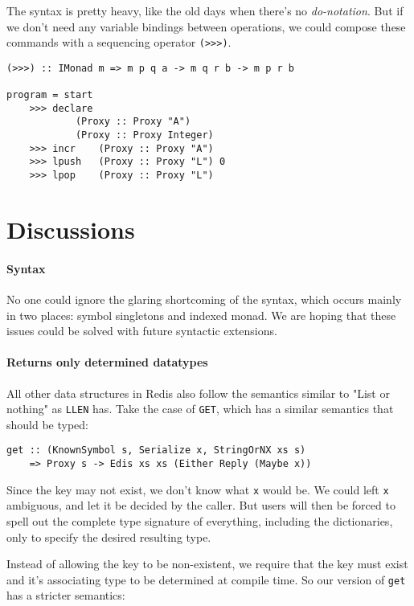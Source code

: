 \documentclass[pldi]{sigplanconf-pldi16}
\begin{document}
The syntax is pretty heavy, like the old days when there's no
 \emph{do-notation}\cite{history}. But if we don't need any variable bindings
 between operations, we could compose these commands with a sequencing operator
 \texttt{(>>>)}.

\begin{verbatim}
(>>>) :: IMonad m => m p q a -> m q r b -> m p r b

program = start
    >>> declare
            (Proxy :: Proxy "A")
            (Proxy :: Proxy Integer)
    >>> incr    (Proxy :: Proxy "A")
    >>> lpush   (Proxy :: Proxy "L") 0
    >>> lpop    (Proxy :: Proxy "L")
\end{verbatim}

\section{Discussions}
\paragraph{Syntax}
No one could ignore the glaring shortcoming of the syntax, which occurs mainly
 in two places: symbol singletons and indexed monad. We are hoping that these
 issues could be solved with future syntactic extensions.

\paragraph{Returns only determined datatypes}

All other data structures in Redis also follow the semantics similar to
 "List or nothing" as \texttt{LLEN} has. Take the case of
 \texttt{GET}, which has a similar semantics that should be typed:

\begin{verbatim}
get :: (KnownSymbol s, Serialize x, StringOrNX xs s)
    => Proxy s -> Edis xs xs (Either Reply (Maybe x))
\end{verbatim}

Since the key may not exist, we don't know what \texttt{x} would
be. We could left \texttt{x} ambiguous, and let it be decided by
 the caller. But users will then be forced to spell out the complete
type signature of everything, including the dictionaries, only to specify
the desired resulting type.

Instead of allowing the key to be non-existent, we require that the key must
 exist and it's associating type to be determined at compile time. So our
 version of \texttt{get} has a stricter semantics:
\end{document}
